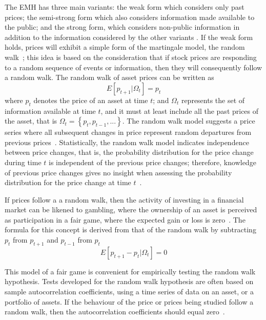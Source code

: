\documentclass[13pt]{report}
\begin{document}
The EMH has three main variants: the weak form which considers only past prices; the semi-strong form which also considers information made available to the public; and the strong form, which considers non-public information in addition to the information considered by the other variants \cite{houthakker1996economics}. If the weak form holds, prices will exhibit a simple form of the martingale model, the random walk~\cite{bailey2005economics}; this idea is based on the consideration that if stock prices are responding to a random sequence of events or information, then they will consequently follow a random walk\cite{houthakker1996economics}. The random walk of asset prices can be written as \[E[p_{t+1}|\Omega_{t}]=p_{t}\] where \(p_{t}\) denotes the price of an asset at time \(t\); and \(\Omega_{t}\) represents the set of information available at time \(t\), and it must at least include all the past prices of the asset, that is \(\Omega_{t}= \left\{p_{t}, p_{t-1},...\right\}\). The random walk model suggests a price series where all subsequent changes in price represent random departures from previous prices~\cite {pricesmalkiel2003efficient}. Statistically, the random walk model indicates independence between price changes, that is, the probability distribution for the price change during time $t$ is independent of the previous price changes; therefore, knowledge of previous price changes gives no insight when assessing the probability distribution for the price change at time $t$~\cite{fama1965behavior}.\par

If prices follow a a random walk, then the activity of investing in a financial market can be likened to gambling, where the ownership of an asset is perceived as participation in a fair game, where the expected gain or loss is zero~\cite{bailey2005economics}. The formula for this concept is derived from that of the random walk by subtracting $p_{t}$ from $p_{t+1}$ and $p_{t-1}$ from $p_{t}$ \[E[p_{t+1}-p_{t}|\Omega_{t}]=0\] 

This model of a fair game is convenient for empirically testing the random walk hypothesis. Tests developed for the random walk hypothesis are often based on sample autocorrelation coefficients, using a time series of data on an asset, or a portfolio of assets. If the behaviour of the price or prices being studied follow a random walk, then the autocorrelation coefficients should equal zero~\cite{bailey2005economics}. 
\end{document}
